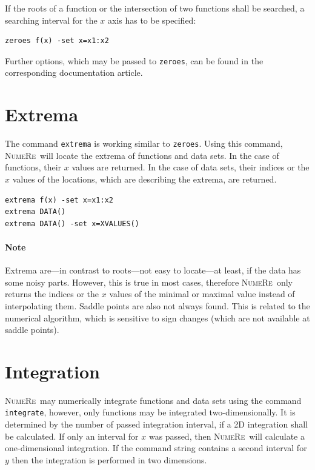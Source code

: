 \documentclass[DIV=14,headsepline,footsepline]{scrbook}
\newcommand{\NR}{\textsc{Nu\-me\-Re}}
\begin{document}
				If the roots of a function or the intersection of two functions shall be searched, a searching interval for the $x$ axis has to be specified:
				\begin{lstlisting}
zeroes f(x) -set x=x1:x2
				\end{lstlisting}
				
				Further options, which may be passed to \lstinline+zeroes+, can be found in the corresponding documentation article.
				
			\section{Extrema}
				The command \lstinline+extrema+ is working similar to \lstinline+zeroes+. Using this command, \NR\ will locate the extrema of functions and data sets. In the case of functions, their $x$ values are returned. In the case of data sets, their indices or the $x$ values of the locations, which are describing the extrema, are returned.
				\begin{lstlisting}
extrema f(x) -set x=x1:x2
extrema DATA()
extrema DATA() -set x=XVALUES()
				\end{lstlisting}
				\paragraph{Note} Extrema are---in contrast to roots---not easy to locate---at least, if the data has some noisy parts. However, this is true in most cases, therefore \NR\ only returns the indices or the $x$ values of the minimal or maximal value instead of interpolating them. Saddle points are also not always found. This is related to the numerical algorithm, which is sensitive to sign changes (which are not available at saddle points).
				
			\section{Integration}
				\NR\ may numerically integrate functions and data sets using the command \lstinline+integrate+, however, only functions may be integrated two-dimensionally. It is determined by the number of passed integration interval, if a 2D integration shall be calculated. If only an interval for $x$ was passed, then \NR\ will calculate a one-dimensional integration. If the command string contains a second interval for $y$ then the integration is performed in two dimensions.
				
\end{document}
